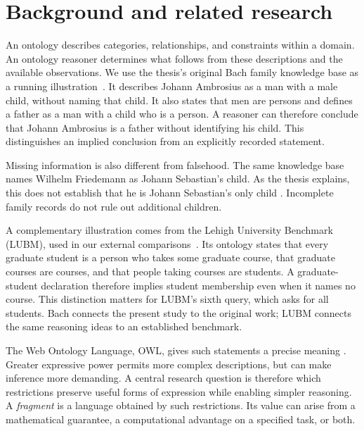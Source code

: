 \section{Background and related research}
\label{sec:background}

An ontology describes categories, relationships, and constraints within a
domain. An ontology reasoner determines what follows from these descriptions
and the available observations. We use the thesis's original Bach family
knowledge base as a running illustration~\cite[Table~2.5, p.~35]{volz2004}.
It describes Johann Ambrosius as a man with a male child, without naming that
child. It also states that men are persons and defines a father as a man with
a child who is a person. A reasoner can therefore conclude that Johann
Ambrosius is a father without identifying his child. This distinguishes an
implied conclusion from an explicitly recorded statement.

Missing information is also different from falsehood. The same knowledge base
names Wilhelm Friedemann as Johann Sebastian's child. As the thesis explains,
this does not establish that he is Johann Sebastian's only child
\cite[Example~5.4.1, p.~131]{volz2004}. Incomplete family records do not rule
out additional children.

A complementary illustration comes from the Lehigh University Benchmark
(LUBM), used in our external comparisons~\cite{guo2005,lubmwebsite}.
Its ontology states that every graduate student is a person who takes some
graduate course, that graduate courses are courses, and that people taking
courses are students. A graduate-student declaration therefore implies
student membership even when it names no course. This distinction matters
for LUBM's sixth query, which asks for all students. Bach connects the present
study to the original work; LUBM connects the same reasoning ideas to an
established benchmark.

The Web Ontology Language, OWL, gives such statements a precise meaning
\cite{owl2004,owldirect2012}. Greater expressive power permits more complex
descriptions, but can make inference more demanding. A central research
question is therefore which restrictions preserve useful forms of expression
while enabling simpler reasoning. A \emph{fragment} is a language obtained by
such restrictions. Its value can arise from a mathematical guarantee, a
computational advantage on a specified task, or both.

